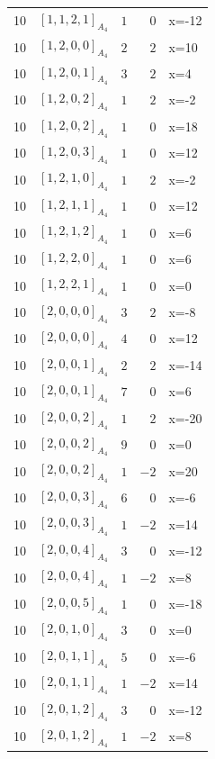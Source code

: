 \documentclass[11pt]{article}
\newcommand{\Dynkin}[1]{#1}
\begin{document}
\begin{longtable}{r l r r l}
10 & $\Dynkin{[1,1,2,1]_{A_4}}$ & $1$ & $0$ & x=-12\\
10 & $\Dynkin{[1,2,0,0]_{A_4}}$ & $2$ & $2$ & x=10\\
10 & $\Dynkin{[1,2,0,1]_{A_4}}$ & $3$ & $2$ & x=4\\
10 & $\Dynkin{[1,2,0,2]_{A_4}}$ & $1$ & $2$ & x=-2\\
10 & $\Dynkin{[1,2,0,2]_{A_4}}$ & $1$ & $0$ & x=18\\
10 & $\Dynkin{[1,2,0,3]_{A_4}}$ & $1$ & $0$ & x=12\\
10 & $\Dynkin{[1,2,1,0]_{A_4}}$ & $1$ & $2$ & x=-2\\
10 & $\Dynkin{[1,2,1,1]_{A_4}}$ & $1$ & $0$ & x=12\\
10 & $\Dynkin{[1,2,1,2]_{A_4}}$ & $1$ & $0$ & x=6\\
10 & $\Dynkin{[1,2,2,0]_{A_4}}$ & $1$ & $0$ & x=6\\
10 & $\Dynkin{[1,2,2,1]_{A_4}}$ & $1$ & $0$ & x=0\\
10 & $\Dynkin{[2,0,0,0]_{A_4}}$ & $3$ & $2$ & x=-8\\
10 & $\Dynkin{[2,0,0,0]_{A_4}}$ & $4$ & $0$ & x=12\\
10 & $\Dynkin{[2,0,0,1]_{A_4}}$ & $2$ & $2$ & x=-14\\
10 & $\Dynkin{[2,0,0,1]_{A_4}}$ & $7$ & $0$ & x=6\\
10 & $\Dynkin{[2,0,0,2]_{A_4}}$ & $1$ & $2$ & x=-20\\
10 & $\Dynkin{[2,0,0,2]_{A_4}}$ & $9$ & $0$ & x=0\\
10 & $\Dynkin{[2,0,0,2]_{A_4}}$ & $1$ & $-2$ & x=20\\
10 & $\Dynkin{[2,0,0,3]_{A_4}}$ & $6$ & $0$ & x=-6\\
10 & $\Dynkin{[2,0,0,3]_{A_4}}$ & $1$ & $-2$ & x=14\\
10 & $\Dynkin{[2,0,0,4]_{A_4}}$ & $3$ & $0$ & x=-12\\
10 & $\Dynkin{[2,0,0,4]_{A_4}}$ & $1$ & $-2$ & x=8\\
10 & $\Dynkin{[2,0,0,5]_{A_4}}$ & $1$ & $0$ & x=-18\\
10 & $\Dynkin{[2,0,1,0]_{A_4}}$ & $3$ & $0$ & x=0\\
10 & $\Dynkin{[2,0,1,1]_{A_4}}$ & $5$ & $0$ & x=-6\\
10 & $\Dynkin{[2,0,1,1]_{A_4}}$ & $1$ & $-2$ & x=14\\
10 & $\Dynkin{[2,0,1,2]_{A_4}}$ & $3$ & $0$ & x=-12\\
10 & $\Dynkin{[2,0,1,2]_{A_4}}$ & $1$ & $-2$ & x=8\\

\end{longtable}
\end{document}
